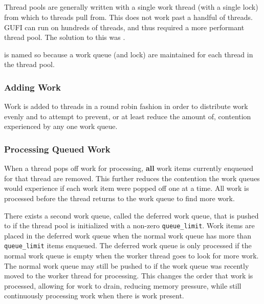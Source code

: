 \subsection{\qptp}
Thread pools are generally written with a single work thread (with a
single lock) from which to threads pull from. This does not work past
a handful of threads. GUFI can run on hundreds of threads, and thus
required a more performant thread pool. The solution to this was
\qptp.

\qptp is named so because a work queue (and lock) are
maintained for each thread in the thread pool.

\subsubsection{Adding Work}
Work is added to threads in a round robin fashion in order to
distribute work evenly and to attempt to prevent, or at least reduce
the amount of, contention experienced by any one work queue.

\subsubsection{Processing Queued Work}
When a thread pops off work for processing, {\bf all} work items
currently enqueued for that thread are removed. This further reduces
the contention the work queues would experience if each work item were
popped off one at a time. All work is processed before the thread
returns to the work queue to find more work.

There exists a second work queue, called the deferred work queue, that
is pushed to if the thread pool is initialized with a non-zero
\texttt{queue\_limit}. Work items are placed in the deferred work
queue when the normal work queue has more than \texttt{queue\_limit}
items enqueued. The deferred work queue is only processed if the
normal work queue is empty when the worker thread goes to look for
more work. The normal work queue may still be pushed to if the work
queue was recently moved to the worker thread for processing. This
changes the order that work is processed, allowing for work to drain,
reducing memory pressure, while still continuously processing work
when there is work present.

